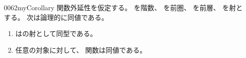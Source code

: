 \documentclass[index]{subfiles}
\begin{document}
\begin{myBlock}{0062}{myCorollary}
  関数外延性を仮定する。
  を階数、
  を前圏、
  を前層、
  を射とする。
  次は論理的に同値である。
  \begin{enumerate}
  \item {}はの射として同型である。
  \item 任意の対象に対して、
    関数は同値である。\myQed
  \end{enumerate}
\end{myBlock}
\end{document}
